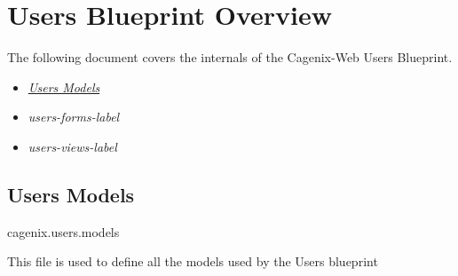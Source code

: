 \documentclass[letterpaper,10pt,english]{sphinxmanual}
\begin{document}
\chapter{Users Blueprint Overview}
\label{dev-users::doc}\label{dev-users:users-blueprint-overview}
The following document covers the internals of the Cagenix-Web Users
Blueprint.
\begin{itemize}
\item {} 
{\hyperref[dev-users:users-models-label]{\emph{Users Models}}}

\item {} 
\emph{users-forms-label}

\item {} 
\emph{users-views-label}

\end{itemize}


\section{Users Models}
\label{dev-users:users-models-label}\label{dev-users:module-cagenix.users.models}\label{dev-users:users-models}
cagenix.users.models

This file is used to define all the models used by the Users blueprint
\end{document}

